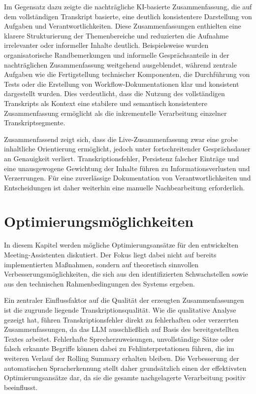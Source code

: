 Im Gegensatz dazu zeigte die nachträgliche KI-basierte Zusammenfassung, die auf dem vollständigen Transkript basierte, eine deutlich konsistentere Darstellung von Aufgaben und Verantwortlichkeiten. Diese Zusammenfassungen enthielten eine klarere Strukturierung der Themenbereiche und reduzierten die Aufnahme irrelevanter oder informeller Inhalte deutlich. Beispielsweise wurden organisatorische Randbemerkungen und informelle Gesprächsanteile in der nachträglichen Zusammenfassung weitgehend ausgeblendet, während zentrale Aufgaben wie die Fertigstellung technischer Komponenten, die Durchführung von Tests oder die Erstellung von Workflow-Dokumentationen klar und konsistent dargestellt wurden. Dies verdeutlicht, dass die Nutzung des vollständigen Transkripts als Kontext eine stabilere und semantisch konsistentere Zusammenfassung ermöglicht als die inkrementelle Verarbeitung einzelner Transkriptsegmente.

Zusammenfassend zeigt sich, dass die Live-Zusammenfassung zwar eine grobe inhaltliche Orientierung ermöglicht, jedoch unter fortschreitender Gesprächsdauer an Genauigkeit verliert. Transkriptionsfehler, Persistenz falscher Einträge und eine unausgewogene Gewichtung der Inhalte führen zu Informationsverlusten und Verzerrungen. Für eine zuverlässige Dokumentation von Verantwortlichkeiten und Entscheidungen ist daher weiterhin eine manuelle Nachbearbeitung erforderlich.


\newpage
\section{Optimierungsmöglichkeiten}
\label{optimierung}
In diesem Kapitel werden mögliche Optimierungsansätze für den entwickelten Meeting-Assistenten diskutiert. Der Fokus liegt dabei nicht auf bereits implementierten Maßnahmen, sondern auf theoretisch sinnvollen Verbesserungsmöglichkeiten, die sich aus den identifizierten Schwachstellen sowie aus den technischen Rahmenbedingungen des Systems ergeben.

Ein zentraler Einflussfaktor auf die Qualität der erzeugten Zusammenfassungen ist die zugrunde liegende Transkriptionsqualität. Wie die qualitative Analyse gezeigt hat, führen Transkriptionsfehler direkt zu fehlerhaften oder verzerrten Zusammenfassungen, da das LLM ausschließlich auf Basis des bereitgestellten Textes arbeitet. Fehlerhafte Sprecherzuweisungen, unvollständige Sätze oder falsch erkannte Begriffe können dabei zu Fehlinterpretationen führen, die im weiteren Verlauf der Rolling Summary erhalten bleiben. Die Verbesserung der automatischen Spracherkennung stellt daher grundsätzlich einen der effektivsten Optimierungsansätze dar, da sie die gesamte nachgelagerte Verarbeitung positiv beeinflusst.

